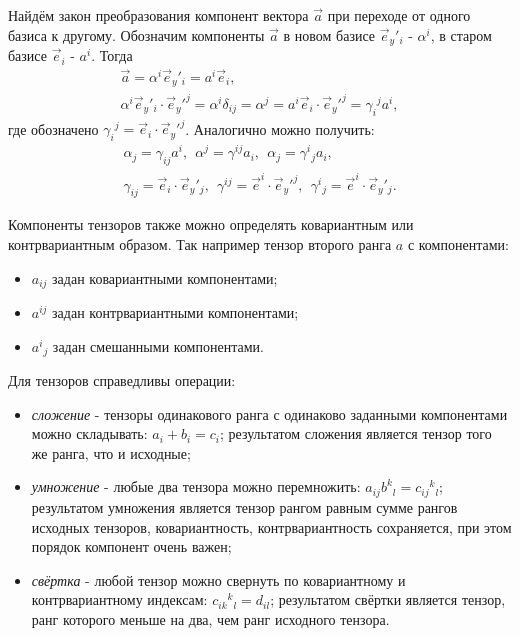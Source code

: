 Найдём закон преобразования компонент вектора \( \vec{a} \) при переходе от
одного базиса к другому. Обозначим компоненты \( \vec{a} \) в новом базисе
\( \vec{e}_y{'}_{i} \) - \( \alpha^i \), в старом базисе \( \vec{e}_{i} \) -
\( a^i \). Тогда
\begin{gather*}
    \vec{a} = \alpha^i\vec{e}_y{'}_{i} = a^i\vec{e}_{i}, \\
    \alpha^i \vec{e}_y{'}_{i}\cdot \vec{e}_y{'}^{j} = \alpha^i \delta_{ij} =
    \alpha^j = a^i\vec{e}_{i}\cdot \vec{e}_y{'}^{j} = \gamma_i{}^j a^i,
\end{gather*}
где обозначено \( \gamma_i{}^j = \vec{e}_{i}\cdot \vec{e}_y{'}^{j} \).
Аналогично можно получить:
\begin{gather*}
    \alpha_j =
    \gamma_{ij} a^i,~~
    \alpha^j =
    \gamma^{ij} a_i,~~
    \alpha_j =
    \gamma^i{}_j  a_i, \\
    \gamma_{ij} = \vec{e}_{i}\cdot \vec{e}_y{'}_{j},~~
    \gamma^{ij} = \vec{e}^{i}\cdot \vec{e}_y{'}^{j},~~    
    \gamma^i{}_j = \vec{e}^{i}\cdot \vec{e}_y{'}_{j}.
\end{gather*}
    
Компоненты тензоров также можно определять ковариантным или контрвариантным
 образом. Так например тензор второго ранга \( a \) с компонентами:
\begin{itemize}
    \item \( a_{ij} \) задан ковариантными компонентами;
    \item \( a^{ij} \) задан контрвариантными компонентами;
    \item \( a^i{}_j \) задан смешанными компонентами.
\end{itemize}

Для тензоров справедливы операции:
\begin{itemize}
    \item \emph{сложение} - тензоры одинакового ранга с одинаково заданными
    компонентами можно складывать: \( a_i + b_i = c_i \); результатом сложения
    является тензор того же ранга, что и исходные;
    \item \emph{умножение} - любые два тензора можно перемножить:
    \( a_{ij}b^k{}_l = c_{ij}{}^k{}_l \); результатом умножения является тензор
    рангом равным сумме рангов  исходных тензоров, ковариантность,
    контрвариантность сохраняется, при этом порядок компонент очень важен;
    \item \emph{свёртка} - любой тензор можно свернуть по ковариантному и
    контрвариантному индексам: \( c_{ik}{}^k{}_l = d_{il}  \); результатом
    свёртки является тензор, ранг которого меньше на два, чем ранг исходного
    тензора.
\end{itemize}   

